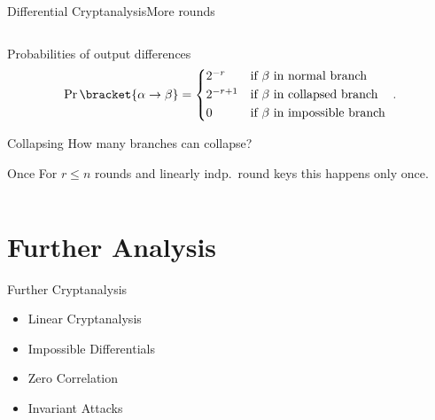 \begin{frame}{Differential Cryptanalysis}{More rounds}
\begin{columns}
\begin{column}{0.49\textwidth}
\begin{block}{Probabilities of output differences}
\begin{equation*}
                    \Prob\bracket{\alpha \to \beta} = \begin{cases*}
                        2^{-r}   & if $\beta$ in normal branch\\
                        2^{-r+1} & if $\beta$ in collapsed branch\\
                        0        & if $\beta$ in impossible branch
                    \end{cases*}.
                \end{equation*}
            \end{block}
            \begin{alertblock}{Collapsing}
                How many branches can collapse?
            \end{alertblock}
            \begin{exampleblock}{Once}
                For $r \leqslant n$ rounds and linearly indp.\ round keys this happens only once.
            \end{exampleblock}
        \end{column}
    \end{columns}
\end{frame}

\section{Further Analysis}
\begin{frame}{Further Cryptanalysis}
    \begin{itemize}
        \item Linear Cryptanalysis
        \item Impossible Differentials
        \item Zero Correlation
        \item Invariant Attacks
    \end{itemize}
\end{frame}

